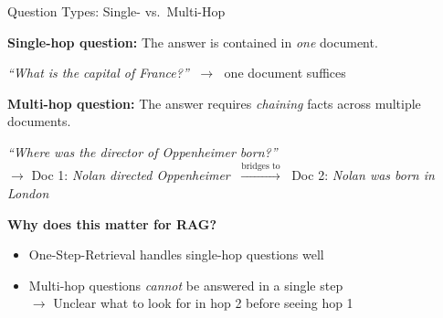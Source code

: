 \documentclass[11pt,compress,t,notes=noshow, xcolor=table]{beamer}
\begin{document}
\begin{frame}{Question Types: Single- vs.\ Multi-Hop}

\vfill

\textbf{Single-hop question:} The answer is contained in \textit{one} document.

\begin{tcolorbox}[
    colback=green!6, colframe=green!50!black,
    boxrule=0.8pt, arc=3pt,
    left=6pt, right=6pt, top=4pt, bottom=4pt,
    title={\small\textbf{Example}}, fonttitle=\small
]
{\small \textit{``What is the capital of France?''} $\;\rightarrow\;$ one document suffices}
\end{tcolorbox}

\vspace{.5em}

\textbf{Multi-hop question:} The answer requires \textit{chaining} facts across multiple documents.

\begin{tcolorbox}[
    colback=orange!6, colframe=orange!70!black,
    boxrule=0.8pt, arc=3pt,
    left=6pt, right=6pt, top=4pt, bottom=4pt,
    title={\small\textbf{Example}}, fonttitle=\small
]
\textit{``Where was the director of Oppenheimer born?''}\\[2pt]
{\scriptsize $\rightarrow$ Doc 1: \textit{Nolan directed Oppenheimer}
$\;\xrightarrow{\text{bridges to}}\;$
Doc 2: \textit{Nolan was born in London}}
\end{tcolorbox}

\vspace{.5em}

\textbf{Why does this matter for RAG?}
\begin{itemize}
    \item One-Step-Retrieval handles single-hop questions well
    \item Multi-hop questions \textit{cannot} be answered in a single step\\
    $\rightarrow$ Unclear what to look for in hop 2 before seeing hop 1
\end{itemize}

\vfill

\end{frame}

\end{document}
